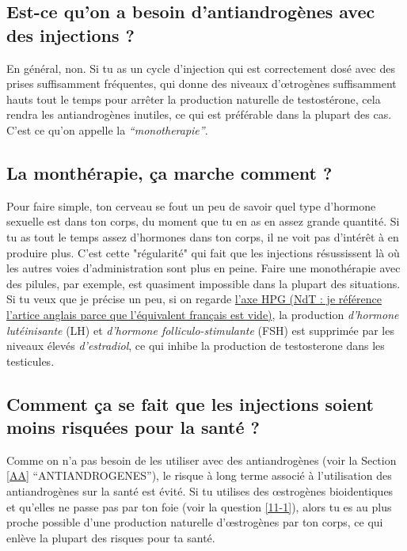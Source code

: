 \documentclass{article}
\begin{document}
\subsection{Est-ce qu'on a besoin d'antiandrogènes avec des injections ?}

En général, non. Si tu as un cycle d'injection qui est correctement dosé avec des prises suffisamment fréquentes, qui donne des niveaux d'œtrogènes suffisamment hauts tout le temps pour arrêter la production naturelle de testostérone, cela rendra les antiandrogènes inutiles, ce qui est préférable dans la plupart des cas. C'est ce qu'on appelle la \textit{“monotherapie”}.

\subsection{La monthérapie, ça marche comment ?}\label{2-3}

Pour faire simple, ton cerveau se fout un peu de savoir quel type d'hormone sexuelle est dans ton corps, du moment que tu en as en assez grande quantité. Si tu as tout le temps assez d'hormones dans ton corps, il ne voit pas d'intérêt à en produire plus. C'est cette "régularité" qui fait que les injections résussissent là où les autres voies d'administration sont plus en peine. Faire une monothérapie avec des pilules, par exemple, est quasiment impossible dans la plupart des situations. Si tu veux que je précise un peu, si on regarde \href{https://en.wikipedia.org/wiki/Hypothalamic-pituitary-gonadal_axis}{l'axe HPG (NdT : je référence l'artice anglais parce que l'équivalent français est vide)}, la production \textit{d'hormone lutéinisante} (LH) et \textit{d'hormone folliculo-stimulante} (FSH) est supprimée par les niveaux élevés \textit{d'estradiol}, ce qui inhibe la production de testosterone dans les testicules. 

\subsection{Comment ça se fait que les injections soient moins risquées pour la santé ?}

Comme on n'a pas besoin de les utiliser avec des antiandrogènes (voir la Section \ref{AA} “ANTIANDROGENES”), le risque à long terme associé à l'utilisation des antiandrogènes sur la santé est évité. Si tu utilises des œstrogènes bioidentiques et qu'elles ne passe pas par ton foie (voir la question \ref{11-1}), alors tu es au plus proche possible d'une production naturelle d'œstrogènes par ton corps, ce qui enlève la plupart des risques pour ta santé.
\end{document}
